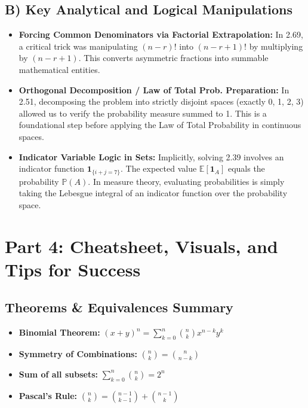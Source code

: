 \documentclass[11pt]{article}
\theoremstyle{definition}
\theoremstyle{plain}
\theoremstyle{remark}
\newcommand{\Prob}{\mathbb{P}}
\newcommand{\E}{\mathbb{E}}
\newcommand{\ind}{\mathbf{1}}
\begin{document}
\subsection{B) Key Analytical and Logical Manipulations}
\begin{itemize}
    \item \textbf{Forcing Common Denominators via Factorial Extrapolation:} In 2.69, a critical trick was manipulating $(n-r)!$ into $(n-r+1)!$ by multiplying by $(n-r+1)$. This converts asymmetric fractions into summable mathematical entities.
    \item \textbf{Orthogonal Decomposition / Law of Total Prob. Preparation:} In 2.51, decomposing the problem into strictly disjoint spaces (exactly 0, 1, 2, 3) allowed us to verify the probability measure summed to 1. This is a foundational step before applying the Law of Total Probability in continuous spaces.
    \item \textbf{Indicator Variable Logic in Sets:} Implicitly, solving 2.39 involves an indicator function $\ind_{\{i+j=7\}}$. The expected value $\E[\ind_A]$ equals the probability $\Prob(A)$. In measure theory, evaluating probabilities is simply taking the Lebesgue integral of an indicator function over the probability space.
\end{itemize}

\section{Part 4: Cheatsheet, Visuals, and Tips for Success}

\subsection{Theorems \& Equivalences Summary}
\begin{itemize}
    \item \textbf{Binomial Theorem:} $(x+y)^n = \sum_{k=0}^n \binom{n}{k} x^{n-k}y^k$
    \item \textbf{Symmetry of Combinations:} $\binom{n}{k} = \binom{n}{n-k}$
    \item \textbf{Sum of all subsets:} $\sum_{k=0}^n \binom{n}{k} = 2^n$
    \item \textbf{Pascal's Rule:} $\binom{n}{k} = \binom{n-1}{k-1} + \binom{n-1}{k}$
\end{itemize}
\end{document}
